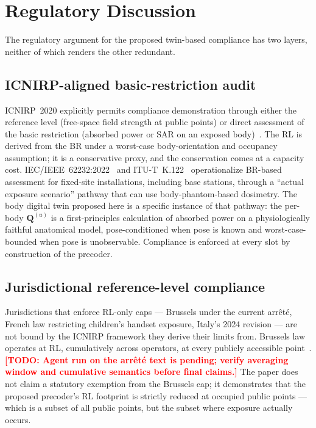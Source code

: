 \documentclass[journal,twoside,onecolumn]{IEEEtran}
\theoremstyle{definition}
\newcommand{\TODO}[1]{\textcolor{red}{\textbf{[TODO: #1]}}}
\newcommand{\Q}{\mathbf{Q}}
\begin{document}
\section{Regulatory Discussion}\label{sec:regulatory}

The regulatory argument for the proposed twin-based compliance has
two layers, neither of which renders the other redundant.

\subsection{ICNIRP-aligned basic-restriction audit}

ICNIRP~2020 explicitly permits compliance demonstration through
either the reference level (free-space field strength at public
points) or direct assessment of the basic restriction (absorbed
power or SAR on an exposed body)~\cite{ICNIRP2020}. The RL is
derived from the BR under a worst-case body-orientation and
occupancy assumption; it is a conservative proxy, and the
conservation comes at a capacity cost.
IEC/IEEE~62232:2022~\cite{IEC62232} and
ITU-T~K.122~\cite{K122} operationalize BR-based assessment for
fixed-site installations, including base stations, through a
``actual exposure scenario'' pathway that can use
body-phantom-based dosimetry. The body digital twin proposed here
is a specific instance of that pathway: the per-body $\Q^{(u)}$ is
a first-principles calculation of absorbed power on a
physiologically faithful anatomical model, pose-conditioned when
pose is known and worst-case-bounded when pose is unobservable.
Compliance is enforced at every slot by construction of the
precoder.

\subsection{Jurisdictional reference-level compliance}

Jurisdictions that enforce RL-only caps --- Brussels under the
current arrêté, French law restricting children's handset
exposure, Italy's 2024 revision --- are not bound by the
ICNIRP framework they derive their limits from. Brussels law
operates at RL, cumulatively across operators, at every publicly
accessible point~\cite{BrusselsArrete}.\TODO{Agent run on the
arrêté text is pending; verify averaging window and cumulative
semantics before final claims.} The paper does not claim a
statutory exemption from the Brussels cap; it demonstrates that
the proposed precoder's RL footprint is strictly reduced at
occupied public points --- which is a subset of all public points,
but the subset where exposure actually occurs.
\end{document}
